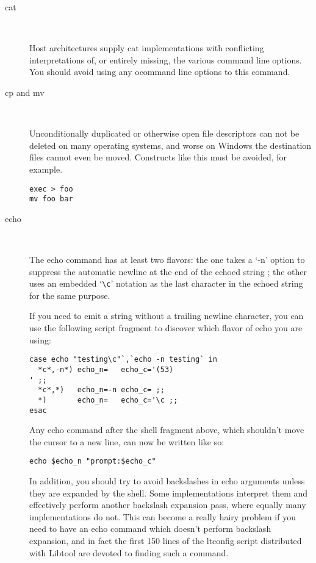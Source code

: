 \begin{description}
\item[cat]
\

    Host architectures supply cat implementations with conflicting interpretations of, or entirely missing, the various command line options. You should avoid using any ocommand line options to this command.

\item[cp and mv]
\

    Unconditionally duplicated or otherwise open file descriptors can not be deleted on many operating systems, and worse on Windows the destination files cannot even be moved. Constructs like this must be avoided, for example.

\begin{Verbatim}[frame=single]
exec > foo
mv foo bar
\end{Verbatim}

\item[echo]
\

The echo command has at least two flavors: the one takes a `-n' 
option to suppress the automatic newline at the end of the echoed string
; the other uses an embedded `\verb+\c+' notation as the last character in the 
echoed string for the same purpose.

If you need to emit a string without a trailing newline character, you can use the following script fragment to discover which flavor of echo you are using: 

\begin{Verbatim}[frame=single]
case echo "testing\c"`,`echo -n testing` in
  *c*,-n*) echo_n=   echo_c='(53)
' ;;
  *c*,*)   echo_n=-n echo_c= ;;
  *)       echo_n=   echo_c='\c ;;
esac
\end{Verbatim}

Any echo command after the shell fragment above, which shouldn't move the cursor to a new line, can now be written like so:

 	

\begin{Verbatim}[frame=single]
echo $echo_n "prompt:$echo_c"
\end{Verbatim}

In addition, you should try to avoid backslashes in echo arguments unless they are expanded by the shell. Some implementations interpret them and effectively perform another backslash expansion pass, where equally many implementations do not. This can become a really hairy problem if you need to have an echo command which doesn't perform backslash expansion, and in fact the first 150 lines of the ltconfig script distributed with Libtool are devoted to finding such a command. 


\end{description}
